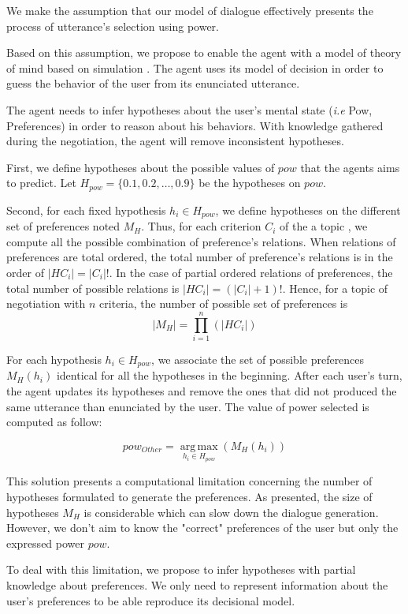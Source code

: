\documentclass[conference, letterpaper]{IEEEtran}
\begin{document}
We make the assumption that our model of dialogue effectively presents the process of utterance's selection using power. 

Based on this assumption, we propose to enable the agent with a model of theory of mind based on simulation \cite{bibid}. The agent uses its model of decision in order to guess the behavior of the user from its enunciated utterance.   

The agent needs to infer hypotheses about the user's mental state (\emph{i.e} Pow, Preferences) in order to reason about his behaviors. With knowledge gathered during the negotiation, the agent will remove inconsistent hypotheses.

First, we define hypotheses about the possible values of $pow$ that the agents aims to predict. Let $H_{pow} = \{0.1, 0.2, \ldots, 0.9\}$ be the hypotheses on $pow$.

Second, for each fixed hypothesis $ h_i \in H_{pow}$, we define hypotheses on the different set of preferences  noted $M_H $. Thus, for each criterion $C_i$ of the a topic , we compute all the possible combination of preference's relations. When relations of preferences are total ordered, the total number of preference's relations is in the order of $|H{C_i}| = |C_i|!$. In the case of partial ordered relations of preferences, the total number of possible relations is  $ |H{C_i}| = (|C_i| + 1)!$. Hence, for a topic of negotiation with $n$ criteria, the number of possible set of preferences is 
$$ |M_H| = \prod_{i=1}^n (|H{C_i}|)$$ 

For each hypothesis $ h_i \in H_{pow}$, we associate the set of possible preferences $M_H(h_i)$ identical for all the hypotheses in the beginning. After each user's turn, the agent updates its hypotheses and remove the ones that did not produced the same utterance than enunciated by the user. The value of power selected is computed as follow:

\begin{equation}
pow_{Other} = \operatorname*{arg\,max}_{h_i \in H_{pow}} (M_H(h_i))
\end{equation} 

This solution presents a computational limitation concerning the number of hypotheses formulated to generate the preferences. As presented, the size of hypotheses $M_H$ is considerable which can slow down the dialogue generation. However, we don't aim to know the "correct" preferences of the user but only the expressed power $pow$. 

To deal with this limitation, we propose to infer hypotheses with partial knowledge about preferences. We only need to represent information about the user's preferences to be able reproduce its decisional model. 
\end{document}
